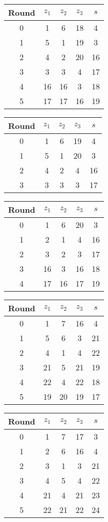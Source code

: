 \begin{multicols}{2}
\begin{tabular}{c | c | c | c | c }
Round & $z_1$ & $z_2$ & $z_3$ & $s$ \\
\hline
0 & 1 & 6 & 18 & 4 \\
1 & 5 & 1 & 19 & 3 \\
2 & 4 & 2 & 20 & 16 \\
3 & 3 & 3 & 4 & 17 \\
4 & 16 & 16 & 3 & 18 \\
5 & 17 & 17 & 16 & 19
\end{tabular}


\begin{tabular}{c | c | c | c | c }
Round & $z_1$ & $z_2$ & $z_3$ & $s$ \\
\hline
0 & 1 & 6 & 19 & 4 \\
1 & 5 & 1 & 20 & 3 \\
2 & 4 & 2 & 4 & 16 \\
3 & 3 & 3 & 3 & 17
\end{tabular}


\begin{tabular}{c | c | c | c | c }
Round & $z_1$ & $z_2$ & $z_3$ & $s$ \\
\hline
0 & 1 & 6 & 20 & 3 \\
1 & 2 & 1 & 4 & 16 \\
2 & 3 & 2 & 3 & 17 \\
3 & 16 & 3 & 16 & 18 \\
4 & 17 & 16 & 17 & 19
\end{tabular}


\begin{tabular}{c | c | c | c | c }
Round & $z_1$ & $z_2$ & $z_3$ & $s$ \\
\hline
0 & 1 & 7 & 16 & 4 \\
1 & 5 & 6 & 3 & 21 \\
2 & 4 & 1 & 4 & 22 \\
3 & 21 & 5 & 21 & 19 \\
4 & 22 & 4 & 22 & 18 \\
5 & 19 & 20 & 19 & 17
\end{tabular}


\begin{tabular}{c | c | c | c | c }
Round & $z_1$ & $z_2$ & $z_3$ & $s$ \\
\hline
0 & 1 & 7 & 17 & 3 \\
1 & 2 & 6 & 16 & 4 \\
2 & 3 & 1 & 3 & 21 \\
3 & 4 & 5 & 4 & 22 \\
4 & 21 & 4 & 21 & 23 \\
5 & 22 & 21 & 22 & 24
\end{tabular}



\end{multicols}
